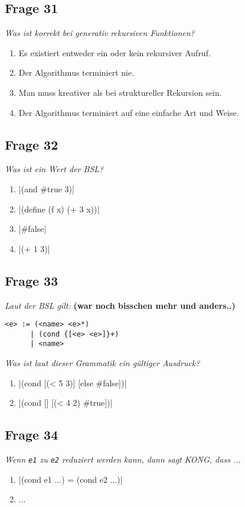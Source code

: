 \documentclass[a4paper, 11pt]{article}
\begin{document}
\subsection*{Frage 31}
\textit{Was ist korrekt bei generativ rekursiven Funktionen?}
\begin{enumerate}[label=$\square$]
	\item Es existiert entweder ein oder kein rekursiver Aufruf.
	\item Der Algorithmus terminiert nie.
	\item Man muss kreativer als bei struktureller Rekursion sein.
	\item Der Algorithmus terminiert auf eine einfache Art und Weise.
\end{enumerate}

\subsection*{Frage 32}
\textit{Was ist ein Wert der BSL?}
\begin{enumerate}[label=$\square$]
	\item {}|(and #true 3)|
	\item {}|(define (f x) (+ 3 x))|
	\item {}|#false|
	\item {}|(+ 1 3)|
\end{enumerate}

\subsection*{Frage 33}
\textit{Laut der BSL gilt:} \textbf{(war noch bisschen mehr und anders..)}
\begin{verbatim}
<e> := (<name> <e>*)
      | (cond {[<e> <e>]}+)
      | <name>
\end{verbatim}
\textit{Was ist laut dieser Grammatik ein gültiger Ausdruck?}
\begin{enumerate}[label=$\square$]
	\item {}|(cond [(< 5 3)] [else #false])|
	\item {}|(cond [] [(< 4 2) #true])|
\end{enumerate}

\subsection*{Frage 34}
\textit{Wenn \texttt{e1} zu \texttt{e2} reduziert werden kann, dann sagt KONG, dass ...}
\begin{enumerate}[label=$\square$]
	\item {}|(cond e1 ...) = (cond e2 ...)|
	\item ...
\end{enumerate}
\end{document}
